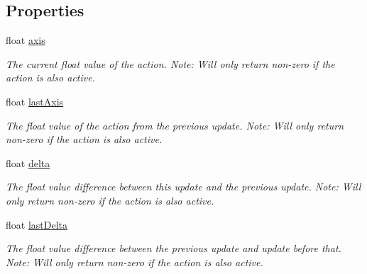 \subsection*{Properties}
\begin{DoxyCompactItemize}
\item 
float \mbox{\hyperlink{interface_valve_1_1_v_r_1_1_i_steam_v_r___action___single_a51e2b958e7e678850dbe748478029091}{axis}}
\begin{DoxyCompactList}\small\item\em The current float value of the action. Note\+: Will only return non-\/zero if the action is also active. \end{DoxyCompactList}\item 
float \mbox{\hyperlink{interface_valve_1_1_v_r_1_1_i_steam_v_r___action___single_a6217b8a72e297e41c529f870b72cd674}{last\+Axis}}
\begin{DoxyCompactList}\small\item\em The float value of the action from the previous update. Note\+: Will only return non-\/zero if the action is also active. \end{DoxyCompactList}\item 
float \mbox{\hyperlink{interface_valve_1_1_v_r_1_1_i_steam_v_r___action___single_a105b3532179c7545252c39e0485cacbb}{delta}}
\begin{DoxyCompactList}\small\item\em The float value difference between this update and the previous update. Note\+: Will only return non-\/zero if the action is also active. \end{DoxyCompactList}\item 
float \mbox{\hyperlink{interface_valve_1_1_v_r_1_1_i_steam_v_r___action___single_a8589001fdb512d0be19ab4f6bbbadc95}{last\+Delta}}
\begin{DoxyCompactList}\small\item\em The float value difference between the previous update and update before that. Note\+: Will only return non-\/zero if the action is also active. \end{DoxyCompactList}\end{DoxyCompactItemize}


